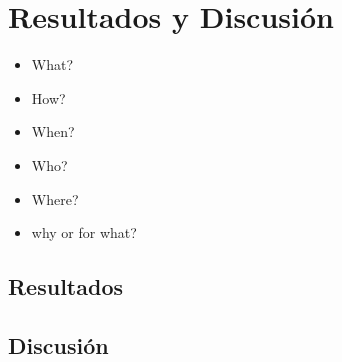 \chapter{Resultados y Discusión}\label{chap:result}

\begin{graybox}
\begin{itemize}
\item What?
\item How?
\item When?
\item Who?
\item Where?
\item why or for what?
\end{itemize}
\end{graybox}



\section{Resultados}








\section{Discusión}


